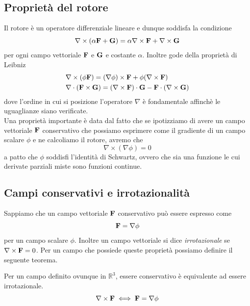 \subsection{Propriet\`a del rotore}

Il rotore \`e un operatore differenziale lineare e dunque soddisfa la condizione 
\begin{equation*}
	\nabla \times (\alpha \bold{F} + \bold{G}) = \alpha \nabla \times \bold{F} + \nabla \times \bold{G}
\end{equation*}
per ogni campo vettoriale $\bold{F}$ e $\bold{G}$ e costante $\alpha$. Inoltre gode della propriet\`a di Leibniz 
\begin{equation*}
\begin{aligned}
	& \nabla \times (\phi \bold{F}) = (\nabla \phi) \times \bold{F} + \phi(\nabla \times \bold{F}) \\ 
	& \nabla \cdot (\bold{F} \times \bold{G}) = (\nabla \times \bold{F}) \cdot \bold{G} - \bold{F} \cdot (\nabla \times \bold{G}) 
\end{aligned}
\end{equation*}
dove l'ordine in cui si posizione l'operatore $\nabla$ \`e fondamentale affinch\`e le uguaglianze siano verificate.
\\
Una propriet\`a importante \`e data dal fatto che se ipotizziamo di avere un campo vettoriale $\bold{F}$  conservativo che possiamo esprimere come il gradiente di un campo scalare $\phi$ e ne calcoliamo il rotore, avremo che 
\begin{equation*}
	\nabla \times (\nabla\phi) = 0
\end{equation*}
a patto che $\phi$ soddisfi l'identit\`a di Schwartz, ovvero che sia una funzione  le cui derivate parziali miste sono funzioni continue.

\subsection{Campi conservativi e irrotazionalit\`a}

Sappiamo che un campo vettoriale $\bold{F}$ conservativo pu\`o essere espresso come
\begin{equation*}
	\bold{F} = \nabla \phi
\end{equation*}
per un campo scalare $\phi$. Inoltre un campo vettoriale si dice \textit{irrotazionale} se $\nabla \times \bold{F} = 0$. Per un campo che possiede queste propriet\`a possiamo definire il seguente teorema.
\begin{theorem}
	Per un campo definito ovunque in $\mathbb{R}^3$, essere conservativo \`e equivalente ad essere irrotazionale.
	\begin{equation*}
		\nabla \times \bold{F} \iff \bold{F} = \nabla \phi
	\end{equation*}
\end{theorem}

